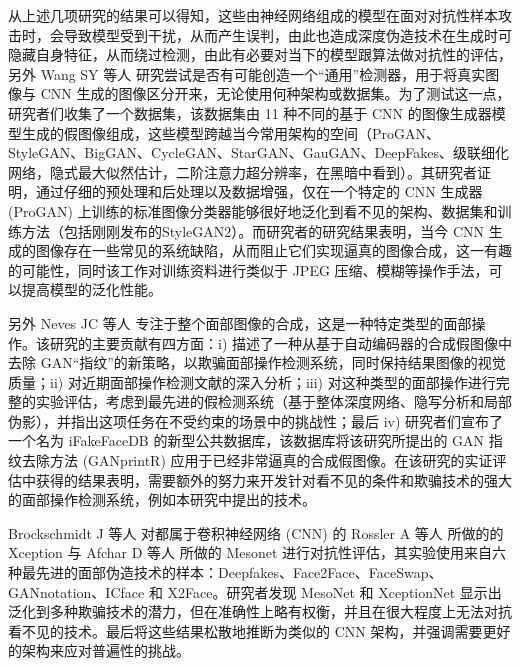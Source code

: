 从上述几项研究的结果可以得知，这些由神经网络组成的模型在面对对抗性样本攻击时，会导致模型受到干扰，从而产生误判，由此也造成深度伪造技术在生成时可隐藏自身特征，从而绕过检测，由此有必要对当下的模型跟算法做对抗性的评估，另外 Wang SY 等人 \cite{kurakin2018adversarial} 研究尝试是否有可能创造一个“通用”检测器，用于将真实图像与 CNN 生成的图像区分开来，无论使用何种架构或数据集。为了测试这一点，研究者们收集了一个数据集，该数据集由 11 种不同的基于 CNN 的图像生成器模型生成的假图像组成，这些模型跨越当今常用架构的空间（ProGAN、StyleGAN、BigGAN、CycleGAN、StarGAN、GauGAN、DeepFakes、级联细化网络，隐式最大似然估计，二阶注意力超分辨率，在黑暗中看到）。其研究者证明，通过仔细的预处理和后处理以及数据增强，仅在一个特定的 CNN 生成器 (ProGAN) 上训练的标准图像分类器能够很好地泛化到看不见的架构、数据集和训练方法（包括刚刚发布的StyleGAN2）。而研究者的研究结果表明，当今 CNN 生成的图像存在一些常见的系统缺陷，从而阻止它们实现逼真的图像合成，这一有趣的可能性，同时该工作对训练资料进行类似于 JPEG 压缩、模糊等操作手法，可以提高模型的泛化性能。

另外 Neves JC 等人 \cite{neves2020ganprintr} 专注于整个面部图像的合成，这是一种特定类型的面部操作。该研究的主要贡献有四方面：i) 描述了一种从基于自动编码器的合成假图像中去除 GAN“指纹”的新策略，以欺骗面部操作检测系统，同时保持结果图像的视觉质量；ii) 对近期面部操作检测文献的深入分析；iii) 对这种类型的面部操作进行完整的实验评估，考虑到最先进的假检测系统（基于整体深度网络、隐写分析和局部伪影），并指出这项任务在不受约束的场景中的挑战性；最后 iv) 研究者们宣布了一个名为 iFakeFaceDB 的新型公共数据库，该数据库将该研究所提出的 GAN 指纹去除方法 (GANprintR) 应用于已经非常逼真的合成假图像。在该研究的实证评估中获得的结果表明，需要额外的努力来开发针对看不见的条件和欺骗技术的强大的面部操作检测系统，例如本研究中提出的技术。

Brockschmidt J 等人 \cite{brockschmidt2019generality} 
对都属于卷积神经网络 (CNN) 的 Rossler A 等人 \cite{rossler2019faceforensics++} 所做的的 Xception 与 Afchar D 等人 \cite{afchar2018mesonet} 所做的 Mesonet 进行对抗性评估，其实验使用来自六种最先进的面部伪造技术的样本：Deepfakes、Face2Face、FaceSwap、GANnotation、ICface 和 X2Face。研究者发现 MesoNet 和 XceptionNet 显示出泛化到多种欺骗技术的潜力，但在准确性上略有权衡，并且在很大程度上无法对抗看不见的技术。最后将这些结果松散地推断为类似的 CNN 架构，并强调需要更好的架构来应对普遍性的挑战。

